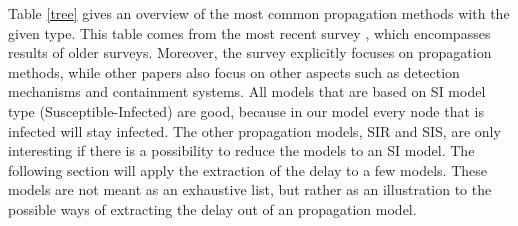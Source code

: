 Table \ref{tree} gives an overview of the most common propagation methods with the given type. This table comes from the most recent survey \citep{wang2014modeling}, which encompasses results of older surveys. Moreover, the survey explicitly focuses on propagation methods, while other papers also focus on other aspects such as  detection mechanisms and containment systems. All models that are based on SI model type (Susceptible-Infected) are good, because in our model every node that is infected will stay infected. The other propagation models, SIR and SIS, are only interesting if there is a possibility to reduce the models to an SI model. The following section will apply the extraction of the delay to a few models. These models are not meant as an exhaustive list, but rather as an illustration to the possible ways of extracting the delay out of an propagation model. 










